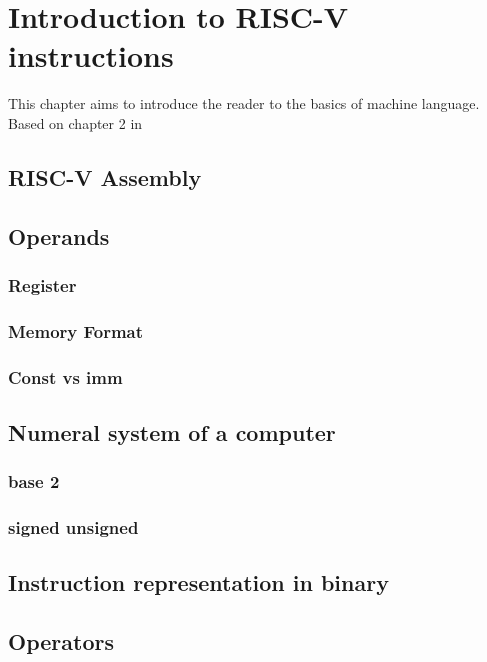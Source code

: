 \chapter{Introduction to RISC-V instructions}

This chapter aims to introduce the reader to the basics of machine language. Based on chapter 2 in \cite{riscVbook} 

\section{RISC-V Assembly}
    
\section{Operands}

    \subsection{Register}
    
    \subsection{Memory Format}
    
    \subsection{Const vs imm }
    
\section{Numeral system of a computer}

    \subsection{base 2}
    
    \subsection{signed unsigned}
    
\section{Instruction representation in binary}

\section{Operators}
    
